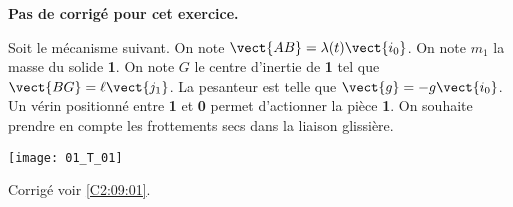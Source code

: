 \normaltrue
\correctionfalse


\setcounter{numques}{0}
\ifcorrection
\else
\textbf{Pas de corrigé pour cet exercice.}
\fi

\ifprof
\else
Soit le mécanisme suivant. On note $\vect{AB}=\lambda(t)\vect{i_0}$. On note $m_1$ la masse du solide \textbf{1}.
On note $G$ le centre d'inertie de \textbf{1} tel que $\vect{BG}=\ell \vect{j_1}$. La pesanteur est telle que $\vect{g}=-g\vect{i_0}$. Un vérin positionné entre \textbf{1} et \textbf{0} permet d'actionner la pièce \textbf{1}. 
On souhaite prendre en compte les frottements secs dans la liaison glissière.
\begin{center}
\texttt{[image: 01\_T\_01]}
\end{center}
\fi



\ifprof
\else
\fi


\ifprof
\else
\begin{flushright}
\footnotesize{Corrigé  voir \ref{C2:09:01}.}
\end{flushright}%
\fi


